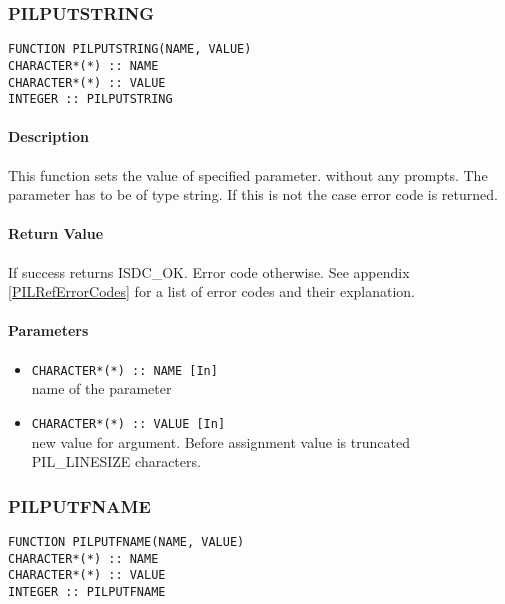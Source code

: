 
\subsubsection{PILPUTSTRING}

\begin{verbatim}
FUNCTION PILPUTSTRING(NAME, VALUE) 
CHARACTER*(*) :: NAME 
CHARACTER*(*) :: VALUE 
INTEGER :: PILPUTSTRING 
\end{verbatim}

\paragraph{Description\\}
This function sets the value of specified parameter. without any prompts.
The parameter has to be of type
string. If this is not the case error code is returned. 
  
\paragraph{Return Value\\}
If success returns ISDC\_OK. Error code otherwise. See appendix \ref{PILRefErrorCodes}
for a list of error codes and their explanation.

\paragraph{Parameters}
\begin{itemize}
\item
{\tt CHARACTER*(*) :: NAME [In] } \\
name of the parameter 
\item
{\tt CHARACTER*(*) :: VALUE [In] } \\
new value for argument. Before assignment value is truncated PIL\_LINESIZE
characters.
\end{itemize}



\subsubsection{PILPUTFNAME}

\begin{verbatim}
FUNCTION PILPUTFNAME(NAME, VALUE) 
CHARACTER*(*) :: NAME 
CHARACTER*(*) :: VALUE 
INTEGER :: PILPUTFNAME 
\end{verbatim}

